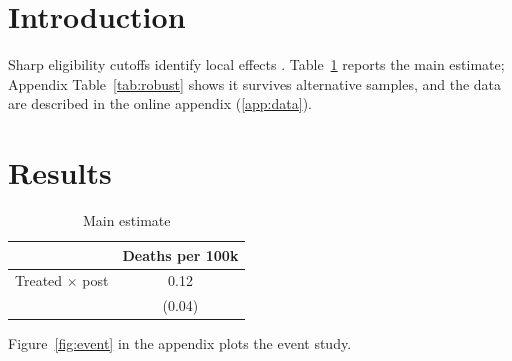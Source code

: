 \section{Introduction}\label{sec:intro}
Sharp eligibility cutoffs identify local effects \citep{imbens2008regression}. Table~\ref{tab:main} reports the main estimate; Appendix Table~\ref{tab:robust} shows it survives alternative samples, and the data are described in the online appendix (\ref{app:data}).

\section{Results}\label{sec:results}
\begin{table}[h]
  \centering
  \caption{Main estimate}\label{tab:main}
  \begin{tabular}{lc}
    \toprule
    & Deaths per 100k \\
    \midrule
    Treated $\times$ post & 0.12 \\
                          & (0.04) \\
    \bottomrule
  \end{tabular}
\end{table}

Figure~\ref{fig:event} in the appendix plots the event study.

